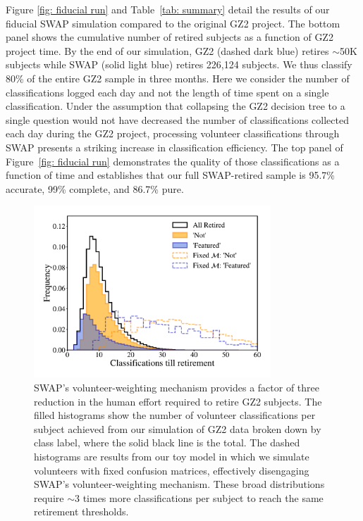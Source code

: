 Figure \ref{fig: fiducial run} and Table~\ref{tab: summary} detail the results of 
our fiducial SWAP simulation compared to the original GZ2 project. 
The bottom panel shows the cumulative number of retired subjects as a function of 
GZ2 project time. By the end of our simulation, GZ2 (dashed dark blue)
 retires $\sim$50K subjects while SWAP (solid light blue) retires 226,124 subjects.  
We thus classify 80\% of the entire GZ2 sample in three months. 
{Here we consider the number of classifications logged each day and not the length 
of time spent on a single classification.  Under the assumption that collapsing the 
GZ2 decision tree to a single question would not have decreased the number of 
classifications  collected each day during the GZ2 project, processing volunteer classifications 
through SWAP presents a striking increase in classification efficiency.}
The top panel of Figure~\ref{fig: fiducial run} demonstrates the quality of 
those classifications as a function of time and establishes that our full 
SWAP-retired sample is 95.7\% accurate, 99\% complete, and 86.7\% pure. 

\begin{figure}[t!] 
\centering
\includegraphics[width=3.5in]{Figures/human_machine/f4.pdf}
\caption[SWAP volunteer weighting mechanism reduces human effort for classification]{SWAP's volunteer-weighting mechanism provides a factor of three reduction in the human effort required to retire GZ2 subjects. The filled histograms show the number of volunteer classifications per subject achieved from our simulation of GZ2 data broken down by class label, where the solid black line is the total. The dashed histograms are results from our toy model in which we simulate volunteers with fixed confusion matrices, effectively disengaging SWAP's volunteer-weighting mechanism. These broad distributions require $\sim$3 times more classifications per subject to reach the same retirement thresholds.} 
\label{fig: swap vote distributions}
\end{figure}

